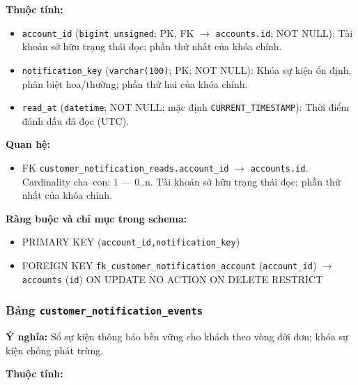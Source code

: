 \textbf{Thuộc tính:}

\begin{itemize}

\item \texttt{account\_id} (\texttt{bigint unsigned}; PK, FK $\rightarrow$ \texttt{accounts.id}; NOT NULL): Tài khoản sở hữu trạng thái đọc; phần thứ nhất của khóa chính.

\item \texttt{notification\_key} (\texttt{varchar(100)}; PK; NOT NULL): Khóa sự kiện ổn định, phân biệt hoa/thường; phần thứ hai của khóa chính.

\item \texttt{read\_at} (\texttt{datetime}; NOT NULL; mặc định \texttt{CURRENT\_TIMESTAMP}): Thời điểm đánh dấu đã đọc (UTC).

\end{itemize}

\textbf{Quan hệ:}

\begin{itemize}

\item FK \texttt{customer\_notification\_reads.account\_id} $\rightarrow$ \texttt{accounts.id}. Cardinality cha--con: 1 — 0..n. Tài khoản sở hữu trạng thái đọc; phần thứ nhất của khóa chính.

\end{itemize}

\textbf{Ràng buộc và chỉ mục trong schema:}

\begin{itemize}

\item PRIMARY KEY (\texttt{account\_id,notification\_key})

\item FOREIGN KEY \texttt{fk\_customer\_notification\_account} (\texttt{account\_id}) $\rightarrow$ \texttt{accounts} (\texttt{id}) ON UPDATE NO ACTION ON DELETE RESTRICT

\end{itemize}

\subsubsection{Bảng \texttt{customer\_notification\_events}}

\textbf{Ý nghĩa:} Sổ sự kiện thông báo bền vững cho khách theo vòng đời đơn; khóa sự kiện chống phát trùng.\par

\textbf{Thuộc tính:}

